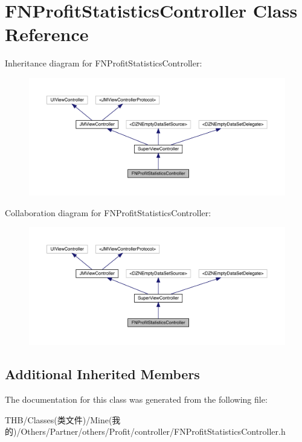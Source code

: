 \hypertarget{interface_f_n_profit_statistics_controller}{}\section{F\+N\+Profit\+Statistics\+Controller Class Reference}
\label{interface_f_n_profit_statistics_controller}


Inheritance diagram for F\+N\+Profit\+Statistics\+Controller\+:\nopagebreak
\begin{figure}[H]
\begin{center}
\leavevmode
\includegraphics[width=350pt]{interface_f_n_profit_statistics_controller__inherit__graph}
\end{center}
\end{figure}


Collaboration diagram for F\+N\+Profit\+Statistics\+Controller\+:\nopagebreak
\begin{figure}[H]
\begin{center}
\leavevmode
\includegraphics[width=350pt]{interface_f_n_profit_statistics_controller__coll__graph}
\end{center}
\end{figure}
\subsection*{Additional Inherited Members}


The documentation for this class was generated from the following file\+:\begin{DoxyCompactItemize}
\item 
T\+H\+B/\+Classes(类文件)/\+Mine(我的)/\+Others/\+Partner/others/\+Profit/controller/F\+N\+Profit\+Statistics\+Controller.\+h\end{DoxyCompactItemize}
